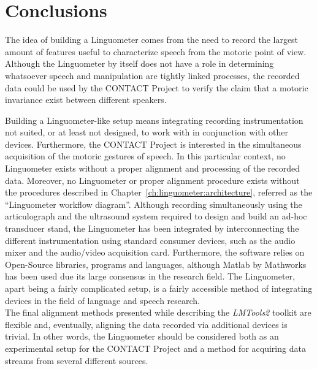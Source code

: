 \section{Conclusions}
\label{ch:conclusions}
The idea of building a Linguometer comes from the need to record the largest
amount of features useful to characterize speech from the motoric point of view.
Although the Linguometer by itself does not have a role in determining
whatsoever speech and manipulation are tightly linked processes, the recorded 
data could be used by the CONTACT Project to verify the claim that a motoric
invariance exist between different speakers.

Building a Linguometer-like setup means integrating recording instrumentation
not suited, or at least not designed, to work with in conjunction with 
other devices.
Furthermore, the CONTACT Project is interested in the simultaneous acquisition
of the motoric gestures of speech.
In this particular context, no Linguometer exists without a proper alignment and
processing of the recorded data.
Moreover, no Linguometer or proper alignment procedure exists without the 
procedures described in Chapter~\ref{ch:linguometer:architecture}, referred 
as the ``Linguometer workflow diagram''.
Although recording simultaneously using the articulograph and the ultrasound
system required to design and build an ad-hoc transducer stand, the Linguometer 
has been integrated by interconnecting the different instrumentation using
standard consumer devices, such as the audio mixer and the audio/video
acquisition card.
Furthermore, the software relies on Open-Source libraries,
programs and languages, although Matlab by Mathworks has been used due its large
consensus in the research field.
The
Linguometer, apart being a fairly complicated setup, is a fairly accessible
method of integrating devices in the field of language and speech research.\\
The final alignment methods presented while describing the \emph{LMTools2}
toolkit are flexible and, eventually, aligning the data recorded via additional
devices  is trivial.
In other words, the Linguometer should be considered both as an experimental
setup for the CONTACT Project and a method for acquiring data streams from 
several different sources.

